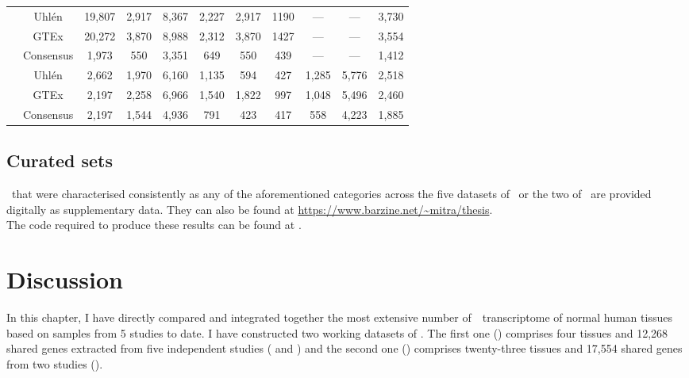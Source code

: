 \begin{landscape}
\begin{table}[]
\begin{tabular}{@{}ccccccccccc@{}}
& Uhlén & 19,807 & 2,917 & 8,367 & 2,227 &
2,917  & 1190  & --- & --- & 3,730  \\
& GTEx & 20,272 & 3,870 & 8,988  & 2,312 &
3,870  & 1427  & --- & --- & 3,554  \\
\cmidrule(l){2-11}
& Consensus & 1,973 & 550 & 3,351 & 649 &
550  & 439 & --- & --- & 1,412  \\
\midrule
\multirow{3}{*}{\rotatebox[origin=c]{90}{\parbox[c]{1.7cm}{\centering Common\\ 23
tissues\\ Working datasets}}} & Uhlén & 2,662  & 1,970  &
6,160 & 1,135 & 594  & 427 & 1,285 &
5,776 & 2,518 \\
& GTEx & 2,197 & 2,258 & 6,966  & 1,540 &
1,822  & 997 & 1,048 & 5,496  & 2,460 \\
\cmidrule(l){2-11}
& Consensus & 2,197 & 1,544 & 4,936 & 791 &
423 & 417 & 558 & 4,223 & 1,885 \\
\bottomrule
\end{tabular}
\end{table}
\end{landscape}
\pagestyle{scrheadings}


\subsection{Curated sets}\label{subsec:Trans_curatedSets}
\vspace{-6mm}
\Pcgs\ that were characterised consistently
as any of the aforementioned categories across the five datasets of \setOne\
or the two of \setTwo\
are provided digitally as supplementary data.
They can also be found at \url{https://www.barzine.net/~mitra/thesis}.
\\The code required to produce these results can be found at \github.


\section{Discussion}\label{sec:Trans_discussion}
\vspace{-6mm}
In this chapter,
I have directly compared and integrated together
the most extensive number of~\Rnaseq\ transcriptome
of normal human tissues based on samples from 5 studies to date.
I have constructed two working datasets of \pcgs.
The first one (\setOne) comprises four tissues
and 12,268 shared genes
extracted from five independent studies
(\cite{Krupp2012,VTpaper,Uhlen2015,GTExTranscript} and \ibm)
and the second one (\setTwo) comprises twenty-three tissues
and 17,554 shared genes
from two studies (\cite{Uhlen2015,GTExTranscript}).


